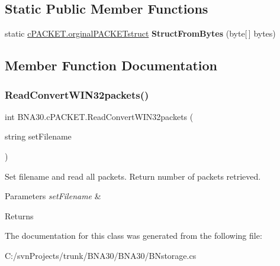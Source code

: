 \subsection*{Static Public Member Functions}
\begin{DoxyCompactItemize}
\item 
\mbox{\label{class_b_n_a30_1_1c_p_a_c_k_e_t_a47eeed702e2a32491a771f5ed77d7c92}} 
static \mbox{\hyperlink{struct_b_n_a30_1_1c_p_a_c_k_e_t_1_1orginal_p_a_c_k_e_tstruct}{c\+P\+A\+C\+K\+E\+T.\+orginal\+P\+A\+C\+K\+E\+Tstruct}} {\bfseries Struct\+From\+Bytes} (byte\mbox{[}$\,$\mbox{]} bytes)
\end{DoxyCompactItemize}


\subsection{Member Function Documentation}
\mbox{\label{class_b_n_a30_1_1c_p_a_c_k_e_t_aff189f3a0a80ce3a299f9c54480b63fe}} 
\subsubsection{\texorpdfstring{ReadConvertWIN32packets()}{ReadConvertWIN32packets()}}
{\footnotesize\ttfamily int B\+N\+A30.\+c\+P\+A\+C\+K\+E\+T.\+Read\+Convert\+W\+I\+N32packets (\begin{DoxyParamCaption}\item[{string}]{set\+Filename }\end{DoxyParamCaption})\hspace{0.3cm}{\ttfamily [inline]}}



Set filename and read all packets. Return number of packets retrieved. 


\begin{DoxyParams}{Parameters}
{\em set\+Filename} & \\
\hline
\end{DoxyParams}
\begin{DoxyReturn}{Returns}

\end{DoxyReturn}


The documentation for this class was generated from the following file\+:\begin{DoxyCompactItemize}
\item 
C\+:/svn\+Projects/trunk/\+B\+N\+A30/\+B\+N\+A30/B\+Nstorage.\+cs\end{DoxyCompactItemize}
